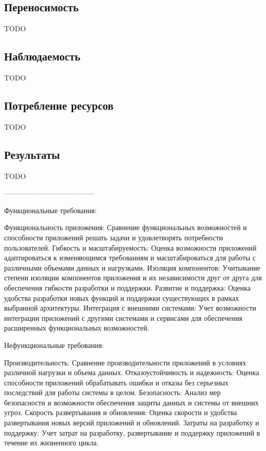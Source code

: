 \subsection{Переносимость}
    TODO

\subsection{Наблюдаемость}
    TODO

\subsection{Потребление ресурсов}
    TODO

\subsection{Результаты}
    TODO


--------------------------------------




Функциональные требования:

    Функциональность приложения: Сравнение функциональных возможностей и способности приложений решать задачи и удовлетворять потребности пользователей.
    Гибкость и масштабируемость: Оценка возможности приложений адаптироваться к изменяющимся требованиям и масштабироваться для работы с различными объемами данных и нагрузками.
    Изоляция компонентов: Учитывание степени изоляции компонентов приложения и их независимости друг от друга для обеспечения гибкости разработки и поддержки.
    Развитие и поддержка: Оценка удобства разработки новых функций и поддержки существующих в рамках выбранной архитектуры.
    Интеграция с внешними системами: Учет возможности интеграции приложений с другими системами и сервисами для обеспечения расширенных функциональных возможностей.

Нефункциональные требования:

    Производительность: Сравнение производительности приложений в условиях различной нагрузки и объема данных.
    Отказоустойчивость и надежность: Оценка способности приложений обрабатывать ошибки и отказы без серьезных последствий для работы системы в целом.
    Безопасность: Анализ мер безопасности и возможности обеспечения защиты данных и системы от внешних угроз.
    Скорость развертывания и обновления: Оценка скорости и удобства развертывания новых версий приложений и обновлений.
    Затраты на разработку и поддержку: Учет затрат на разработку, развертывание и поддержку приложений в течение их жизненного цикла.

